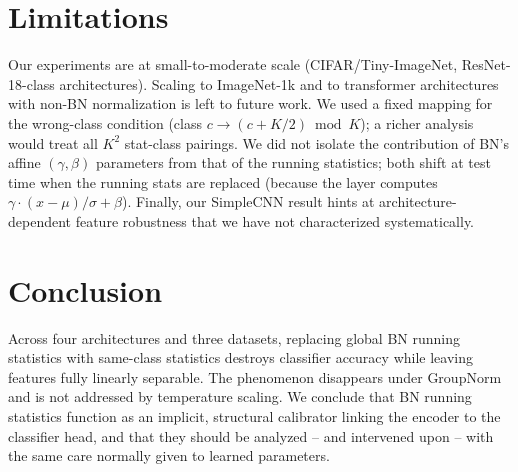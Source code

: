 \documentclass[11pt]{article}
\begin{document}
\section{Limitations}

Our experiments are at small-to-moderate scale (CIFAR/Tiny-ImageNet, ResNet-18-class architectures). Scaling to ImageNet-1k and to transformer architectures with non-BN normalization is left to future work. We used a fixed mapping for the wrong-class condition (class $c \to (c+K/2) \bmod K$); a richer analysis would treat all $K^2$ stat-class pairings. We did not isolate the contribution of BN's affine $(\gamma, \beta)$ parameters from that of the running statistics; both shift at test time when the running stats are replaced (because the layer computes $\gamma \cdot (x - \mu)/\sigma + \beta$). Finally, our SimpleCNN result hints at architecture-dependent feature robustness that we have not characterized systematically.

\section{Conclusion}

Across four architectures and three datasets, replacing global BN running statistics with same-class statistics destroys classifier accuracy while leaving features fully linearly separable. The phenomenon disappears under GroupNorm and is not addressed by temperature scaling. We conclude that BN running statistics function as an implicit, structural calibrator linking the encoder to the classifier head, and that they should be analyzed -- and intervened upon -- with the same care normally given to learned parameters.
\end{document}
